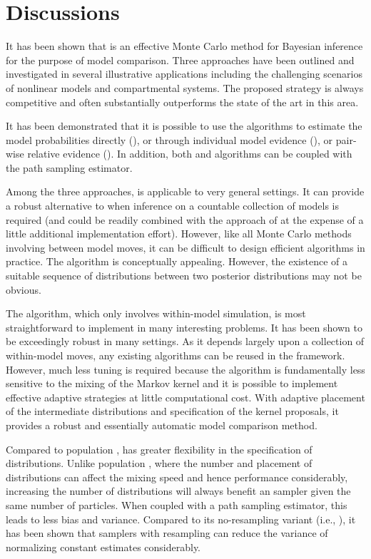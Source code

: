 \section{Discussions}
\label{sec:Bayesian SMC discussion}

It has been shown that \smc is an effective Monte Carlo method for Bayesian inference for the purpose of model comparison. Three approaches have been outlined and investigated in several illustrative applications including the challenging scenarios of nonlinear \ode models and \pet compartmental systems. The proposed strategy is always competitive and often substantially outperforms the state of the art in this area.

It has been demonstrated that it is possible to use the \smc algorithms to estimate the model probabilities directly (\smc[1]), or through individual model evidence (\smc[2]), or pair-wise relative evidence (\smc[3]). In addition, both \smc[2] and \smc[3] algorithms can be coupled with the path sampling estimator.

Among the three approaches, \smc[1] is applicable to very general settings. It can provide a robust alternative to \rjmcmc when inference on a countable collection of models is required (and could be readily combined with the approach of \cite{Jasra:2008bb} at the expense of a little additional implementation effort). However, like all Monte Carlo methods involving between model moves, it can be difficult to design efficient algorithms in practice. The \smc[3] algorithm is conceptually appealing. However, the existence of a suitable sequence of distributions between two posterior distributions may not be obvious.

The \smc[2] algorithm, which only involves within-model simulation, is most straightforward to implement in many interesting problems. It has been shown to be exceedingly robust in many settings. As it depends largely upon a collection of within-model \mcmc moves, any existing \mcmc algorithms can be reused in the \smc[2] framework. However, much less tuning is required because the algorithm is fundamentally less sensitive to the mixing of the Markov kernel and it is possible to implement effective adaptive strategies at little computational cost. With adaptive placement of the intermediate distributions and specification of the \mcmc kernel proposals, it provides a robust and essentially automatic model comparison method.

Compared to population \mcmc, \smc[2] has greater flexibility in the specification of distributions. Unlike population \mcmc, where the number and placement of distributions can affect the mixing speed and hence performance considerably, increasing the number of distributions will always benefit an \smc sampler given the same number of particles. When coupled with a path sampling estimator, this leads to less bias and variance. Compared to its no-resampling variant (i.e., \aic), it has been shown that \smc samplers with resampling can reduce the variance of normalizing constant estimates considerably.

